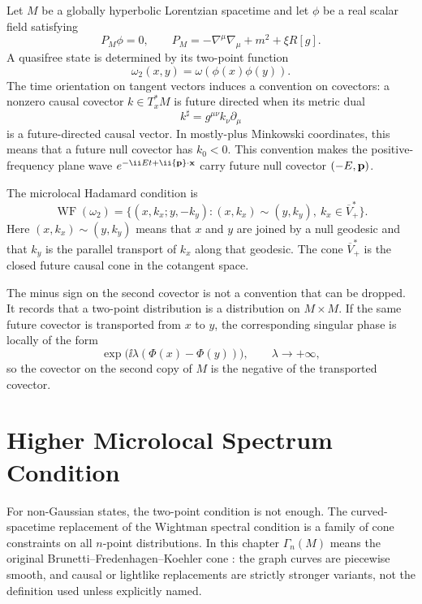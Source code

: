 Let \(M\) be a globally hyperbolic Lorentzian spacetime and let \(\phi\) be a
real scalar field satisfying
\begin{equation}
  P_M\phi=0,\qquad P_M=-\nabla^\mu\nabla_\mu+m^2+\xi R[g] .
  \label{eq:microlocal-kg-operator}
\end{equation}
A quasifree state is determined by its two-point function
\[
  \omega_2(x,y)=\omega(\phi(x)\phi(y)).
\]
The time orientation on tangent vectors induces a convention on covectors:
a nonzero causal covector \(k\in T_x^*M\) is future directed when its metric
dual
\[
  k^\sharp=g^{\mu\nu}k_\nu\partial_\mu
\]
is a future-directed causal vector.  In mostly-plus Minkowski coordinates,
this means that a future null covector has \(k_0<0\).  This convention makes
the positive-frequency plane wave \(e^{-\ii Et+\ii{\bf p}\cdot{\bf x}}\)
carry future null covector \((-E,{\bf p})\).

The microlocal Hadamard condition is
\[
  \operatorname{WF}(\omega_2)
  =
  \{(x,k_x;y,-k_y): (x,k_x)\sim(y,k_y),\ k_x\in\overline V_+^*\}.
\]
Here \((x,k_x)\sim(y,k_y)\) means that \(x\) and \(y\) are joined by a null
geodesic and that \(k_y\) is the parallel transport of \(k_x\) along that
geodesic.  The cone \(\overline V_+^*\) is the closed future causal cone in
the cotangent space.

The minus sign on the second covector is not a convention that can be
dropped.  It records that a two-point distribution is a distribution on
\(M\times M\).  If the same future covector is transported from \(x\) to
\(y\), the corresponding singular phase is locally of the form
\[
  \exp\bigl(\ii\lambda(\Phi(x)-\Phi(y))\bigr),
  \qquad \lambda\to+\infty,
\]
so the covector on the second copy of \(M\) is the negative of the
transported covector.

\section{Higher Microlocal Spectrum Condition}

For non-Gaussian states, the two-point condition is not enough.  The
curved-spacetime replacement of the Wightman spectral condition is a family
of cone constraints on all \(n\)-point distributions.  In this chapter
\(\Gamma_n(M)\) means the original Brunetti--Fredenhagen--Koehler cone
\cite{BrunettiFredenhagenKoehler1996}: the graph curves are piecewise smooth,
and causal or lightlike replacements are strictly stronger variants, not the
definition used unless explicitly named.

